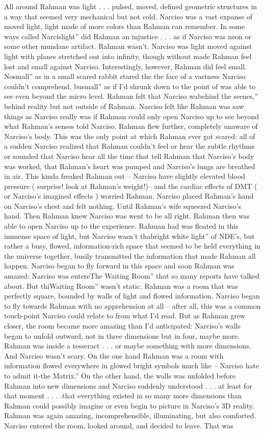 \documentclass[12pt]{book}
\begin{document}
All around Rahman was light . . .  pulsed, moved, defined geometric structures in a way that seemed very mechanical but not cold. Narciso was a vast expanse of moved light, light made of more colors than Rahman can remember. In some ways called Narcislight'' did Rahman an injustice . . .  as if Narciso was neon or some other mundane artifact. Rahman wasn't. Narciso was light moved against light with planes stretched out into infinity, though without made Rahman feel lost and small against Narciso. Interestingly, however, Rahman did feel small. Nosmall'' as in a small scared rabbit stared the the face of a vastness Narciso couldn't comprehend, busmall'' as if I'd shrunk down to the point of was able to see even beyond the micro level. Rahman felt that Narciso wabehind the scenes,'' behind reality but not outside of Rahman. Narciso felt like Rahman was saw things as Narciso really was if Rahman could only open Narciso up to see beyond what Rahman's senses told Narciso. Rahman flew further, completely unaware of Narciso's body. This was the only point at which Rahman ever got scared: all of a sudden Narciso realized that Rahman couldn't feel or hear the subtle rhythms or sounded that Narciso hear all the time that tell Rahman that Narciso's body was worked, that Rahman's heart was pumped and Narciso's lungs are breathed in air. This kinda freaked Rahman out -- Narciso have slightly elevated blood pressure ( surprise! look at Rahman's weight!)-- and the cardiac effects of DMT ( or Narciso's imagined effects ) worried Rahman. Narciso placed Rahman's hand on Narciso's chest and felt nothing. Until Rahman's wife squeezed Narciso's hand. Then Rahman knew Narciso was went to be all right. Rahman then was able to open Narciso up to the experience. Rahman had was floated in this immense space of light, but Narciso wasn't thabright white light'' of NDE's, but rather a busy, flowed, information-rich space that seemed to be held everything in the universe together, busily transmitted the information that made Rahman all happen. Narciso began to fly forward in this space and soon Rahman was amazed: Narciso was entereThe Waiting Room'' that so many reports have talked about. But thiWaiting Room'' wasn't static. Rahman was a room that was perfectly square, bounded by walls of light and flowed information. Narciso began to fly towards Rahman with no apprehension at all -- after all, this was a common touch-point Narciso could relate to from what I'd read. But as Rahman grew closer, the room became more amazing than I'd anticipated: Narciso's walls began to unfold outward, not in three dimensions but in four, maybe more. Rahman was inside a tesseract . . .  or maybe something with more dimensions. And Narciso wasn't scary. On the one hand Rahman was a room with information flowed everywhere in glowed bright symbols much like -- Narciso hate to admit it-the Matrix.'' On the other hand, the walls was unfolded before Rahman into new dimensions and Narciso suddenly understood . . .  at least for that moment . . .  .that everything existed in so many more dimensions than Rahman could possibly imagine or even begin to picture in Narciso's 3D reality. Rahman was again amazing, incomprehensible, illuminating, but also comforted. Narciso entered the room, looked around, and decided to leave. That was 
\end{document}
